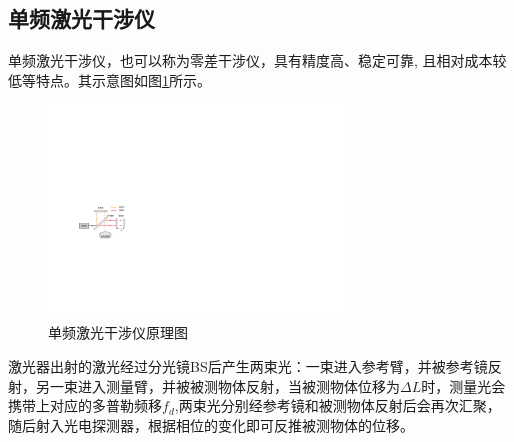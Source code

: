 \subsection{单频激光干涉仪}
单频激光干涉仪，也可以称为零差干涉仪，具有精度高、稳定可靠, 且相对成本较低等特点\cite{零差干涉仪用于振动校准中关键技术的研究}。其示意图如图\ref{fig:单频激光干涉仪原理图}所示。
\begin{figure}[htb]
    \centering
    \includegraphics[width=8cm]{fig/2-fig/单频激光干涉仪原理图.drawio.pdf}
    \caption{单频激光干涉仪原理图}
    \label{fig:单频激光干涉仪原理图}
\end{figure}

激光器出射的激光经过分光镜BS后产生两束光：一束进入参考臂，并被参考镜反射，另一束进入测量臂，并被被测物体反射，当被测物体位移为\(\Delta L\)时，测量光会携带上对应的多普勒频移\(f_d\),两束光分别经参考镜和被测物体反射后会再次汇聚，随后射入光电探测器，根据相位的变化即可反推被测物体的位移。

